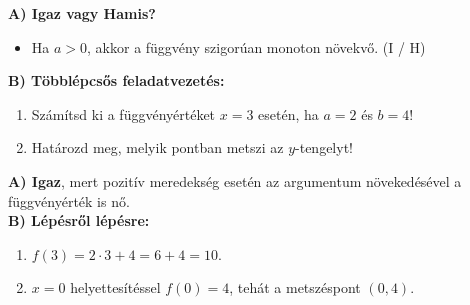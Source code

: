 \documentclass[a4paper,12pt]{article}
\begin{document}
\begin{feladatdoboz}
\textbf{A) Igaz vagy Hamis?}
\begin{itemize}
    \item Ha $a > 0$, akkor a függvény szigorúan monoton növekvő. (I / H)
\end{itemize}

\medskip
\textbf{B) Többlépcsős feladatvezetés:}
\begin{enumerate}[label=\alph*)]
    \item Számítsd ki a függvényértéket $x = 3$ esetén, ha $a = 2$ és $b = 4$!
    \item Határozd meg, melyik pontban metszi az $y$-tengelyt!
\end{enumerate}
\end{feladatdoboz}

\begin{megoldasdoboz}
\textbf{A) Igaz}, mert pozitív meredekség esetén az argumentum növekedésével a függvényérték is nő. \\
\textbf{B) Lépésről lépésre:}
\begin{enumerate}[label=\alph*)]
    \item $f(3) = 2 \cdot 3 + 4 = 6 + 4 = 10$.
    \item $x = 0$ helyettesítéssel $f(0) = 4$, tehát a metszéspont $(0, 4)$.
\end{enumerate}
\end{megoldasdoboz}
\end{document}
